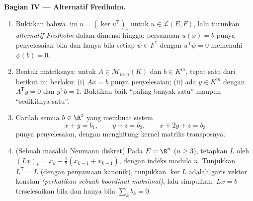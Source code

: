 \begin{problem}
\medskip
\noindent\textbf{Bagian IV --- Alternatif Fredholm.}
\begin{enumerate}[resume]
  \item Buktikan bahwa $\operatorname{im} u = (\ker u^{\mathsf
        T})_\circ$ untuk $u \in \mathcal{L}(E, F)$, lalu turunkan
        \emph{alternatif Fredholm} dalam dimensi hingga: persamaan
        $u(x) = b$ punya penyelesaian bila dan hanya bila setiap
        $\psi \in F^*$ dengan $u^{\mathsf T}\psi = 0$ memenuhi
        $\psi(b) = 0$.
  \item Bentuk matriksnya: untuk $A \in \mathcal{M}_{m,n}(K)$ dan $b \in
        K^m$, tepat satu dari berikut ini berlaku: (i) $Ax = b$
        punya penyelesaian; (ii) ada $y \in K^m$ dengan
        $A^{\mathsf T}y = 0$ dan $y^{\mathsf T}b = 1$. Buktikan baik
        ``paling banyak satu'' maupun ``sedikitnya satu''.
  \item Carilah semua $b \in \R^3$ yang membuat sistem
        \[
        x + y = b_1, \qquad y + z = b_2, \qquad x + 2y + z = b_3
        \]
        punya penyelesaian, dengan menghitung kernel matriks
        transposnya.
  \item (Sebuah masalah Neumann diskret) Pada $E = \R^n$ ($n \geq 3$),
        tetapkan $L$ oleh $(Lx)_k = x_k - \frac12(x_{k-1} +
        x_{k+1})$, dengan indeks modulo $n$. Tunjukkan $L^{\mathsf T} = L$
        (dengan penyamaan kanonik), tunjukkan $\ker L$ adalah garis
        vektor konstan \emph{(perhatikan sebuah koordinat maksimal)},
        lalu simpulkan: $Lx = b$ terselesaikan bila dan hanya bila
        $\sum_k b_k = 0$.
\end{enumerate}


\end{problem}
